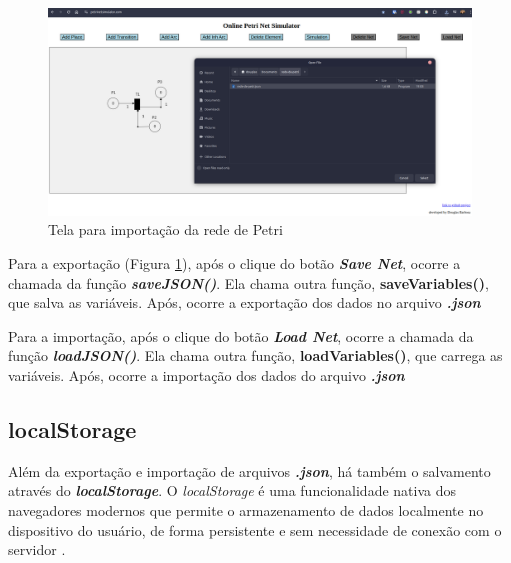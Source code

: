 \documentclass[
	12pt,				%
	openright,			%
	oneside,			%
	a4paper,			%
	english,			%
	brazil				%
	]{abntex2}
\theoremstyle{doispontos}
\begin{document}
\begin{figure}[ht] 
	\centering
	\includegraphics[scale=0.3]{figuras/loadNet.png}
	\caption[Tela para importação da rede de Petri]{Tela para importação da rede de Petri}
	\label{fig:loadNet}
\end{figure}
\FloatBarrier

Para a exportação (Figura \ref{fig:loadNet}), após o clique do botão \textbf{\textit{Save Net}}, ocorre a chamada da função \textbf{\textit{saveJSON()}}. Ela chama outra função, \textbf{saveVariables()}, que salva as variáveis. Após, ocorre a exportação dos dados no arquivo \textbf{\textit{.json}} 



Para a importação, após o clique do botão \textbf{\textit{Load Net}}, ocorre a chamada da função \textbf{\textit{loadJSON()}}. Ela chama outra função, \textbf{loadVariables()}, que carrega as variáveis. Após, ocorre a importação dos dados do arquivo \textbf{\textit{.json}} 



\subsection{localStorage}\label{cap:localStorage} 

Além da exportação e importação de arquivos \textbf{\textit{.json}}, há também o salvamento através do \textbf{\textit{localStorage}}. O \textit{localStorage} é uma funcionalidade nativa dos navegadores modernos que permite o armazenamento de dados localmente no dispositivo do usuário, de forma persistente e sem necessidade de conexão com o servidor \textcite{mdn_local_storage}. 
\end{document}
